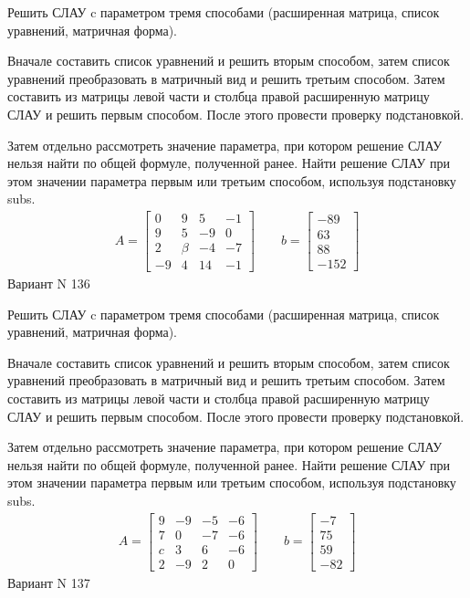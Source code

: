 \documentclass[11pt]{report}
\begin{document}
Решить СЛАУ c параметром тремя способами (расширенная матрица, список уравнений, матричная форма).

Вначале составить список уравнений и решить вторым способом,
затем список уравнений преобразовать в матричный вид и решить третьим способом.
Затем составить из матрицы левой части и столбца правой расширенную матрицу СЛАУ и решить первым способом.
После этого провести проверку подстановкой.

Затем отдельно рассмотреть значение параметра, при котором решение СЛАУ нельзя найти по общей формуле,
полученной ранее.
Найти решение СЛАУ при этом значении параметра первым или третьим способом, используя подстановку subs.
\begin{align*}
    A = \left[\begin{matrix}0 & 9 & 5 & -1\\9 & 5 & -9 & 0\\2 & \beta & -4 & -7\\-9 & 4 & 14 & -1\end{matrix}\right]
\qquad b = \left[\begin{matrix}-89\\63\\88\\-152\end{matrix}\right]
\end{align*}
\newpage
Вариант N 136


Решить СЛАУ c параметром тремя способами (расширенная матрица, список уравнений, матричная форма).

Вначале составить список уравнений и решить вторым способом,
затем список уравнений преобразовать в матричный вид и решить третьим способом.
Затем составить из матрицы левой части и столбца правой расширенную матрицу СЛАУ и решить первым способом.
После этого провести проверку подстановкой.

Затем отдельно рассмотреть значение параметра, при котором решение СЛАУ нельзя найти по общей формуле,
полученной ранее.
Найти решение СЛАУ при этом значении параметра первым или третьим способом, используя подстановку subs.
\begin{align*}
    A = \left[\begin{matrix}9 & -9 & -5 & -6\\7 & 0 & -7 & -6\\c & 3 & 6 & -6\\2 & -9 & 2 & 0\end{matrix}\right]
\qquad b = \left[\begin{matrix}-7\\75\\59\\-82\end{matrix}\right]
\end{align*}
\newpage
Вариант N 137
\end{document}
